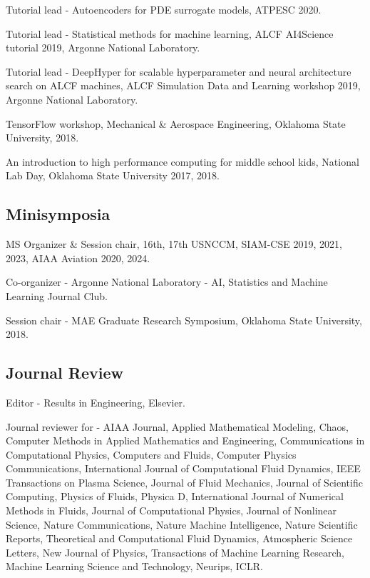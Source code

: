 \documentclass[letterpaper]{article}
\renewenvironment{itemize}{
  \begin{list}{}{
    \setlength{\leftmargin}{1.5em}
  }
}{
  \end{list}
}
\begin{document}
\begin{itemize}
  \item Tutorial lead - Autoencoders for PDE surrogate models, ATPESC 2020.
  \item Tutorial lead - Statistical methods for machine learning, ALCF AI4Science tutorial 2019, Argonne National Laboratory.
  \item Tutorial lead - DeepHyper for scalable hyperparameter and neural architecture search on ALCF machines, ALCF Simulation Data and Learning workshop 2019, Argonne National Laboratory.
  \item TensorFlow workshop, Mechanical \& Aerospace Engineering, Oklahoma State University, 2018.
  \item An introduction to high performance computing for middle school kids, National Lab Day, Oklahoma State University 2017, 2018.
\end{itemize}

\subsection*{Minisymposia}

\begin{itemize}
  \item MS Organizer \& Session chair, 16th, 17th USNCCM, SIAM-CSE 2019, 2021, 2023, AIAA Aviation 2020, 2024.
  \item Co-organizer - Argonne National Laboratory - AI, Statistics and Machine Learning Journal Club.
  \item Session chair - MAE Graduate Research Symposium, Oklahoma State University, 2018.
\end{itemize}

\subsection*{Journal Review}

\begin{itemize}
  \item Editor - Results in Engineering, Elsevier.
  \item Journal reviewer for - AIAA Journal, Applied Mathematical Modeling, Chaos, Computer Methods in Applied Mathematics and Engineering, Communications in Computational Physics, Computers and Fluids, Computer Physics Communications, International Journal of Computational Fluid Dynamics, IEEE Transactions on Plasma Science, Journal of Fluid Mechanics, Journal of Scientific Computing, Physics of Fluids, Physica D, International Journal of Numerical Methods in Fluids, Journal of Computational Physics, Journal of Nonlinear Science, Nature Communications, Nature Machine Intelligence, Nature Scientific Reports, Theoretical and Computational Fluid Dynamics, Atmospheric Science Letters, New Journal of Physics, Transactions of Machine Learning Research, Machine Learning Science and Technology, Neurips, ICLR.
\end{itemize}
\end{document}
